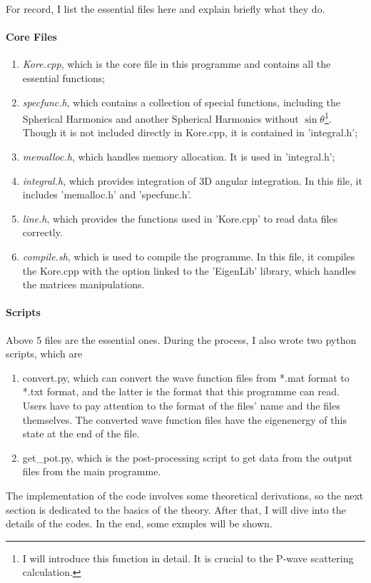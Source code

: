 \documentclass[british,english]{article}
\numberwithin{equation}{section}
\numberwithin{figure}{section}
\begin{document}
For record, I list the essential files here and explain briefly what
they do. 

\paragraph{Core Files}
\begin{enumerate}
\item \emph{Kore.cpp}, which is the core file in this programme and contains
all the essential functions;
\item \emph{specfunc.h}, which contains a collection of special functions,
including the Spherical Harmonics and another Spherical Harmonics
without $\sin\theta$\footnote{I will introduce this function in detail. It is crucial to the P-wave
scattering calculation.}. Though it is not included directly in Kore.cpp, it is contained
in 'integral.h';
\item \emph{memalloc.h}, which handles memory allocation. It is used in
'integral.h';
\item \emph{integral.h}, which provides integration of 3D angular integration.
In this file, it includes 'memalloc.h' and 'specfunc.h'. 
\item \emph{line.h}, which provides the functions used in 'Kore.cpp' to
read data files correctly.
\item \emph{compile.sh}, which is used to compile the programme. In this
file, it compiles the Kore.cpp with the option linked to the 'EigenLib'
library, which handles the matrices manipulations.
\end{enumerate}
%

\paragraph{Scripts\label{subsec:Scripts}}

Above 5 files are the essential ones. During the process, I also wrote
two python scripts, which are 
\begin{enumerate}
\item convert.py, which can convert the wave function files from {*}.mat
format to {*}.txt format, and the latter is the format that this programme
can read. Users have to pay attention to the format of the files'
name and the files themselves. The converted wave function files have
the eigenenergy of this state at the end of the file.
\item get\_pot.py, which is the post-processing script to get data from
the output files from the main programme.
\end{enumerate}
%
The implementation of the code involves some theoretical derivations,
so the next section is dedicated to the basics of the theory. After
that, I will dive into the details of the codes. In the end, some
exmples will be shown.
\end{document}
